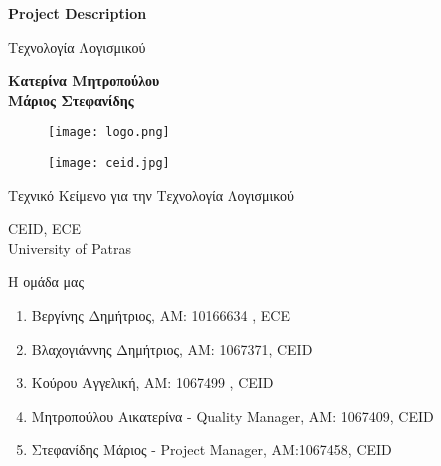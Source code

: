 \documentclass{article}
\begin{document}

\begin{titlepage}
   \begin{center}
       \vspace*{1cm}

       \textbf{\huge Project Description}

       \vspace{0.5cm}
        Τεχνολογία Λογισμικού
            
       \vspace{1cm}

       \textbf{Κατερίνα Μητροπούλου\\Μάριος Στεφανίδης}
       
       \begin{figure}[!htb]
        \centering
        \texttt{[image: logo.png]}
        \end{figure}
        
        \vspace{0.5cm}
        
        \begin{figure}[!htb]
        \centering
        \texttt{[image: ceid.jpg]}
        \end{figure}


       \vfill
            
       Τεχνικό Κείμενο για την Τεχνολογία Λογισμικού\\
            
       \vspace{0.5cm}
            
       CEID, ECE\\
       University of Patras\\
            
   \end{center}
\end{titlepage}



\noindent Η ομάδα μας

\begin{enumerate}
  \item Βεργίνης Δημήτριος, ΑΜ: 10166634 , ECE
  \item Βλαχογιάννης Δημήτριος, ΑΜ: 1067371, CEID
  \item Κούρου Αγγελική, ΑΜ: 1067499 , CEID
  \item Μητροπούλου Αικατερίνα - Quality Manager, ΑΜ: 1067409, CEID
  \item Στεφανίδης Μάριος - Project Manager, ΑΜ:1067458, CEID
\end{enumerate}
\end{document}
